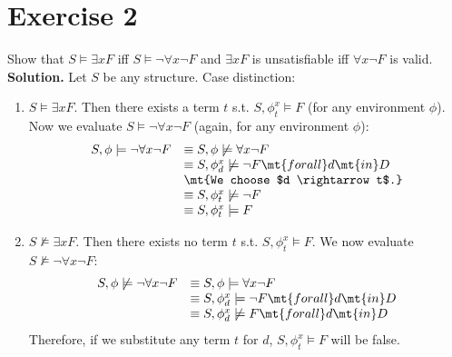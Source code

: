 \section{Exercise 2}

Show that $S \models \exists x F$ iff $S\models \neg\forall x \neg F$ and $\exists x F$ is unsatisfiable iff $\forall x \neg F$ is valid.\\

\noindent
\textbf{Solution.}
Let $S$ be any structure. Case distinction:
\begin{enumerate}
	\item $S \models \exists x F$. Then there exists a term $t$ s.t. $S,\phi^x_t \models F$ (for any environment $\phi$). Now we evaluate $S\models \neg\forall x \neg F$ (again, for any environment $\phi$):
	$$
		\begin{array}{l l}
			S,\phi\models \neg\forall x \neg F & \equiv S,\phi\not\models \forall x \neg F\\
			& \equiv S,\phi^x_{d} \not\models \neg F \mt{ for all } d \mt{ in } D\\
			& \mt{We choose $d \rightarrow t$.}\\
			& \equiv S,\phi^x_{t} \not\models \neg F\\
			& \equiv S,\phi^x_{t} \models F
		\end{array}
	$$
	
	\item $S \not\models \exists x F$. Then there exists no term $t$ s.t. $S,\phi^x_t \models F$. We now evaluate $S\not\models \neg\forall x \neg F$:
	$$
		\begin{array}{l l}
			S,\phi\not\models \neg\forall x \neg F & \equiv S,\phi\models \forall x \neg F\\
			& \equiv S,\phi^x_{d} \models \neg F \mt{ for all } d \mt{ in } D\\
			& \equiv S,\phi^x_{d} \not\models F \mt{ for all } d \mt{ in } D\\
		\end{array}
	$$
	Therefore, if we substitute any term $t$ for $d$, $S,\phi^x_t\models F$ will be false.
\end{enumerate}

